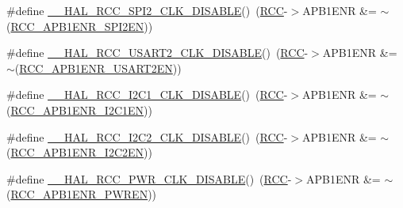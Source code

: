 \begin{DoxyCompactItemize}
\item 
\#define \hyperlink{group___r_c_c___a_p_b1___clock___enable___disable_gabb56a85a6424a60da8edc681f3a1c918}{\+\_\+\+\_\+\+H\+A\+L\+\_\+\+R\+C\+C\+\_\+\+S\+P\+I2\+\_\+\+C\+L\+K\+\_\+\+D\+I\+S\+A\+B\+LE}()~(\hyperlink{group___peripheral__declaration_ga74944438a086975793d26ae48d5882d4}{R\+CC}-\/$>$A\+P\+B1\+E\+NR \&= $\sim$(\hyperlink{group___peripheral___registers___bits___definition_gafdce64692c44bf95efbf2fed054e59be}{R\+C\+C\+\_\+\+A\+P\+B1\+E\+N\+R\+\_\+\+S\+P\+I2\+EN}))
\item 
\#define \hyperlink{group___r_c_c___a_p_b1___clock___enable___disable_ga1edc6c83fbebf8b4265ef9500aa04b04}{\+\_\+\+\_\+\+H\+A\+L\+\_\+\+R\+C\+C\+\_\+\+U\+S\+A\+R\+T2\+\_\+\+C\+L\+K\+\_\+\+D\+I\+S\+A\+B\+LE}()~(\hyperlink{group___peripheral__declaration_ga74944438a086975793d26ae48d5882d4}{R\+CC}-\/$>$A\+P\+B1\+E\+NR \&= $\sim$(\hyperlink{group___peripheral___registers___bits___definition_gab840af4f735ec36419d61c7db3cfa00d}{R\+C\+C\+\_\+\+A\+P\+B1\+E\+N\+R\+\_\+\+U\+S\+A\+R\+T2\+EN}))
\item 
\#define \hyperlink{group___r_c_c___a_p_b1___clock___enable___disable_ga490a853eae72da96aad5379a6e939dd8}{\+\_\+\+\_\+\+H\+A\+L\+\_\+\+R\+C\+C\+\_\+\+I2\+C1\+\_\+\+C\+L\+K\+\_\+\+D\+I\+S\+A\+B\+LE}()~(\hyperlink{group___peripheral__declaration_ga74944438a086975793d26ae48d5882d4}{R\+CC}-\/$>$A\+P\+B1\+E\+NR \&= $\sim$(\hyperlink{group___peripheral___registers___bits___definition_ga5ca3afe0c517702b2d1366b692c8db0e}{R\+C\+C\+\_\+\+A\+P\+B1\+E\+N\+R\+\_\+\+I2\+C1\+EN}))
\item 
\#define \hyperlink{group___r_c_c___a_p_b1___clock___enable___disable_ga3ebc5988bcf1e2965ed482fd76c67b22}{\+\_\+\+\_\+\+H\+A\+L\+\_\+\+R\+C\+C\+\_\+\+I2\+C2\+\_\+\+C\+L\+K\+\_\+\+D\+I\+S\+A\+B\+LE}()~(\hyperlink{group___peripheral__declaration_ga74944438a086975793d26ae48d5882d4}{R\+CC}-\/$>$A\+P\+B1\+E\+NR \&= $\sim$(\hyperlink{group___peripheral___registers___bits___definition_gafd7d1c3c7dbe20aea87a694ae15840f6}{R\+C\+C\+\_\+\+A\+P\+B1\+E\+N\+R\+\_\+\+I2\+C2\+EN}))
\item 
\#define \hyperlink{group___r_c_c___a_p_b1___clock___enable___disable_gaf3db86d2db2bad45732a742b6a91ea0b}{\+\_\+\+\_\+\+H\+A\+L\+\_\+\+R\+C\+C\+\_\+\+P\+W\+R\+\_\+\+C\+L\+K\+\_\+\+D\+I\+S\+A\+B\+LE}()~(\hyperlink{group___peripheral__declaration_ga74944438a086975793d26ae48d5882d4}{R\+CC}-\/$>$A\+P\+B1\+E\+NR \&= $\sim$(\hyperlink{group___peripheral___registers___bits___definition_ga5c19997ccd28464b80a7c3325da0ca60}{R\+C\+C\+\_\+\+A\+P\+B1\+E\+N\+R\+\_\+\+P\+W\+R\+EN}))
\end{DoxyCompactItemize}



